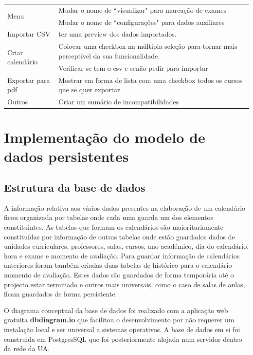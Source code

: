 \documentclass[11pt, twoside]{report}
\begin{document}
\begin{center}
\begin{longtable}{|m{2.2cm}|m{12cm}|}
			\hline
			
			\multirow{2}{2cm}{Menu} &Mudar o nome de ``visualizar" para marcação de exames\\
			&Mudar o nome de ``configurações" para dados auxiliares\\
			\hline
			Importar CSV & ter uma preview dos dados importados.\\
			\hline
			\multirow{2}{2cm}{Criar calendário} & Colocar uma checkbox na múltipla seleção para tornar mais perceptível da sua funcionalidade.\\
			& Verificar se tem o csv e senão pedir para importar\\
			\hline
			Exportar para pdf & Mostrar em forma de lista com uma checkbox todos os cursos que se quer exportar\\
			\hline
			Outros & Criar um sumário de incompatibilidades\\
			\hline
		\end{longtable}
	\end{center}
	
	
	
	 
	
	\chapter{Implementação do modelo de dados persistentes}
	\section{Estrutura da base de dados}
	A informação relativa aos vários dados presentes na elaboração de um calendário ficou organizada por tabelas onde cada uma guarda um dos elementos constituintes.
	As tabelas que formam os calendários são maioritariamente constituídas por informação de outras tabelas onde estão guardados dados de unidades curriculares, professores, salas, cursos, ano académico, dia do calendário, hora e exame e momento de avaliação.
	Para guardar informação de calendários anteriores foram também criadas duas tabelas de histórico para o calendário momento de avaliação.
	Estes dados são guardados de forma temporária até o projecto estar terminado e outros mais universais, como o caso de salas de aulas, ficam guardados de forma persistente.
	
	O diagrama conceptual da base de dados foi realizado com a aplicação web gratuita \textbf{dbdiagram.io} que facilitou o desenvolvimento por não requerer um instalação local e ser universal a sistemas operativos.
	A base de dados em si foi construida em PostgresSQL que foi posteriormente alojada num servidor dentro da rede da UA.
	
\end{document}

